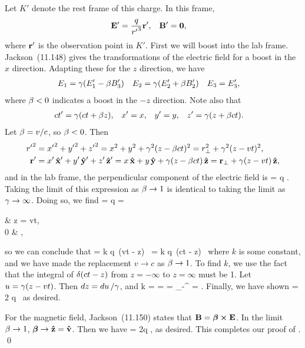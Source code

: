 \begin{solution}
	Let $K'$ denote the rest frame of this charge.  In this frame,
	\begin{align*}
		\vb{E}' &= \frac{q}{{r'}^3} \vb{r}', &
		\vb{B}' &= \mathbf{0},
	\end{align*}
	where $\vb{r}'$ is the observation point in $K'$.
\clearpage
	First we will boost into the lab frame.  Jackson~(11.148) gives the transformations of the electric field for a boost in the $x$ direction.  Adapting these for the $z$ direction, we have
	\begin{align*}
		E_1 &= \gamma (E_1' - \beta B_3') &
		E_2 &= \gamma (E_2' + \beta B_2') &
		E_3 &= E_3',
	\end{align*}
	where $\beta < 0$ indicates a boost in the $-z$ direction.  Note also that
	\begin{align*}
		ct' &= \gamma (c t + \beta z), &
		x' &= x, &
		y' &= y, &
		z' &= \gamma (z + \beta c t).
	\end{align*}
	Let $\beta = v / c$, so $\beta < 0$.  Then
	\begin{align*}
		{r'}^2 &= {x'}^2 + {y'}^2 + {z'}^2
		= x^2 + y^2 + \gamma^2 (z - \beta c t)^2
		= r_\perp^2 + \gamma^2 (z - v t)^2, \\
		\vb{r}' &= x' \,\vb{\hat{x}}' + y' \,\vb{\hat{y}}' + z' \,\vb{\hat{z}}'
		= x \,\vb{\hat{x}} + y \,\vb{\hat{y}} + \gamma (z - \beta c t)\,\vb{\hat{z}}
		= \vb{r}_\perp + \gamma (z - v t)\,\vb{\hat{z}},
	\end{align*}
	and in the lab frame, the perpendicular component of the electric field is
	\beq
		\vEperp = \gam q .
	\eeq
	Taking the limit of this expression as $\beta \to 1$ is identical to taking the limit as $\gamma \to \infty$.  Doing so, we find
	\beq
		\limgam \vEperp = q \vrperp \limgam {}
		= \begin{cases}
			\infty &  z = vt, \\
			0 & ,
		\end{cases}
	\eeq
	so we can conclude that
	\beq
		\limgam \vEperp = k q \,\del(vt - z) \,\vrperp
		= k q \,\del(ct - z) \,\vrperp
	\eeq
	where $k$ is some constant, and we have made the replacement $v \to c$ as $\beta \to 1$.  To find $k$, we use the fact that the integral of $\delta(ct - z)$ from $z = -\infty$ to $z = \infty$ must be 1.  Let $u = \gamma (z - vt)$.  Then $\dd{z} = \dd{u} / \gamma$, and
	\beq
		k = \intii {} \dz
		= \intii {}
		= _{-\infty}^\infty
		= .
	\eeq
	Finally, we have shown
	\beq
		\vEperp = 2 q  \,\delctz
	\eeq
	as desired.
	
	For the magnetic field, Jackson~(11.150) states that $\vb{B} = \boldsymbol{\beta} \cross \vb{E}$.  In the limit $\beta \to 1$, $\boldsymbol{\beta} \to \vb{\hat{z}} = \vb{\hat{v}}$.  Then we have
	\beq
		\vB = 2q  \delctz,
	\eeq
	as desired.  This completes our proof of . \qed
\end{solution}



